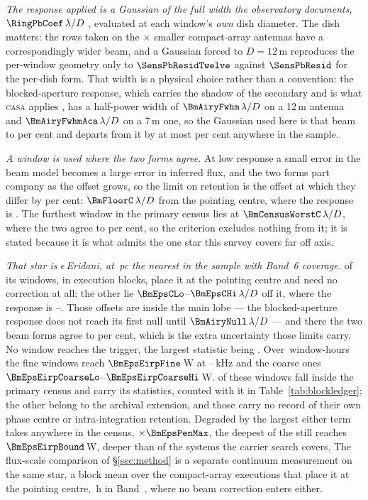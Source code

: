 \emph{The response applied is a Gaussian of the full width the observatory
documents}, $\RingPbCoef\,\lambda/D$ \citep{ALMAHandbook}, evaluated at each
window's \emph{own} dish diameter. The dish matters: the \PbNAcaRow{} rows
taken on the \PbAcaRatio$\times$ smaller compact-array antennas have a
correspondingly wider beam, and a Gaussian forced to $D=12$\,m reproduces the
per-window geometry only to $\SensPbResidTwelve$ against $\SensPbResid$ for
the per-dish form. That width is a physical choice rather than a convention:
the blocked-aperture response, which carries the shadow of the secondary and
is what \textsc{casa} applies \citep{CASA2022}, has a half-power
width of $\BmAiryFwhm\,\lambda/D$ on a 12\,m antenna and
$\BmAiryFwhmAca\,\lambda/D$ on a 7\,m one, so the Gaussian used here is that
beam to \BmDocAiryPct{} per cent and departs from it by at most
\BmModelMaxPct{} per cent anywhere in the sample.

\emph{A window is used where the two forms agree.} At low response a small
error in the beam model becomes a large error in inferred flux, and the two
forms part company as the offset grows, so the limit on retention is the
offset at which they differ by \BmFloorTolPct{} per cent:
$\BmFloorC\,\lambda/D$ from the pointing centre, where the response is
\BmFloorResp. The furthest window in the primary census lies at
$\BmCensusWorstC\,\lambda/D$, where the two agree to \BmCensusWorstPct{} per
cent, so the criterion excludes nothing from it; it is stated because it is
what admits the one star this survey covers far off axis.

\emph{That star is $\epsilon$\,Eridani, at \BmEpsDistPc\,pc the nearest in the
sample with Band~6 coverage.} \BmEpsNOn{} of its \BmEpsNWin{} windows, in
\BmEpsNBlock{} execution blocks, place it at the pointing centre and need no
correction at all; the other \BmEpsNOff{} lie
$\BmEpsCLo$--$\BmEpsCHi\,\lambda/D$ off it, where the response is
\BmEpsRespLo--\BmEpsRespHi. Those offsets are inside the main lobe --- the
blocked-aperture response does not reach its first null until
$\BmAiryNull\,\lambda/D$ --- and there the two beam forms agree to
\BmEpsAgreePct{} per cent, which is the extra uncertainty those limits carry.
No window reaches the trigger, the largest statistic being \BmEpsTMax. Over
\BmEpsHours\,window-hours the \BmEpsNFine{} fine windows reach
$\BmEpsEirpFine$\,W at \BmEpsChanFineKHzLo--\BmEpsChanFineKHzHi\,kHz and the
\BmEpsNCoarse{} coarse ones
$\BmEpsEirpCoarseLo$--$\BmEpsEirpCoarseHi$\,W. \BmEpsNCensus{} of these
windows fall inside the primary census and carry its statistics, counted with
it in Table~\ref{tab:blockledger}; the other \BmEpsNExt{} belong to the
archival extension, and those carry no record of their own phase centre or
intra-integration retention. Degraded by the largest either term takes
anywhere in the census, $\times\BmEpsPenMax$, the deepest of the
\BmEpsNExt{} still reaches $\BmEpsEirpBound$\,W, deeper than
\BmEpsNDeeper{} of the \NSysClassA{} systems the carrier search covers. The
flux-scale
comparison of \S\ref{sec:method} is a separate continuum measurement on the
same star, a block mean over the \PxEpsN{} compact-array executions that place
it at the pointing centre, \PxEpsHours\,h in Band~\PxEpsBand, where no beam
correction enters either.

